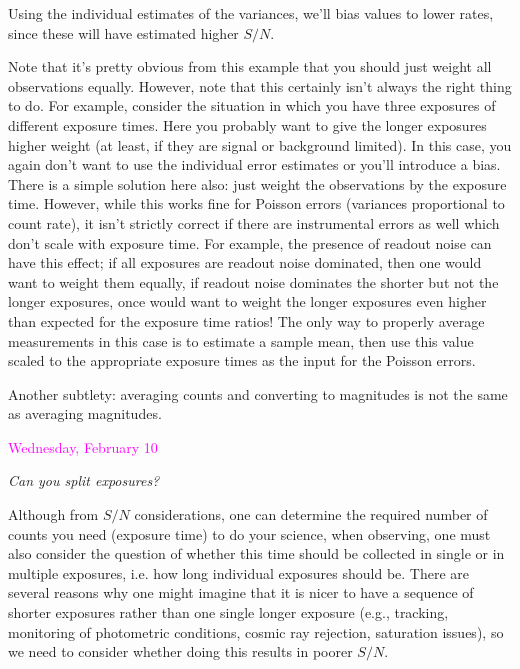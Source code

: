 \documentclass[12pt]{article}
\begin{document}
Using the individual estimates of the variances, we'll bias values to
lower rates, since these will have estimated higher $S/N$.

Note that it's pretty obvious from this example that you should just
weight all observations equally. However, note that this certainly
isn't always the right thing to do. For example, consider the
situation in which you have three exposures of different exposure
times. Here you probably want to give the longer exposures higher
weight (at least, if they are signal or background limited). In this
case, you again don't want to use the individual error estimates or
you'll introduce a bias. There is a simple solution here also: just
weight the observations by the exposure time. However, while this
works fine for Poisson errors (variances proportional to count rate),
it isn't strictly correct if there are instrumental errors as well
which don't scale with exposure time. For example, the presence of
readout noise can have this effect; if all exposures are readout
noise dominated, then one would want to weight them equally, if
readout noise dominates the shorter but not the longer exposures,
once would want to weight the longer exposures even higher than
expected for the exposure time ratios! The only way to properly
average measurements in this case is to estimate a sample mean, then
use this value scaled to the appropriate exposure times as the input
for the Poisson errors.

Another subtlety: averaging counts and converting to magnitudes is
not the same as averaging magnitudes.

\textcolor{magenta}{Wednesday, February 10}

\emph{Can you split exposures?}

Although from $S/N$ considerations, one can determine the required
number of counts you need (exposure time) to do your science, when
observing, one must also consider the question of whether this time
should be collected in single or in multiple exposures, i.e. how long
individual exposures should be. There are several reasons why one
might imagine that it is nicer to have a sequence of shorter
exposures rather than one single longer exposure (e.g., tracking,
monitoring of photometric conditions, cosmic ray rejection,
saturation issues), so we need to consider whether doing this results
in poorer $S/N$.
\end{document}
